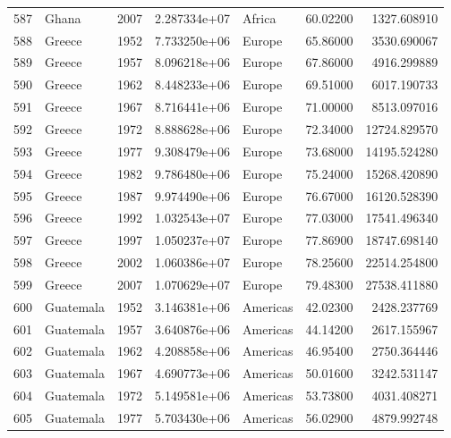 \documentclass[
  letterpaper,
  DIV=11,
  numbers=noendperiod]{scrreprt}
\begin{document}
\begin{tabular}{llrrlrr}
587  &                     Ghana &  2007 &  2.287334e+07 &    Africa &  60.02200 &    1327.608910 \\
588  &                    Greece &  1952 &  7.733250e+06 &    Europe &  65.86000 &    3530.690067 \\
589  &                    Greece &  1957 &  8.096218e+06 &    Europe &  67.86000 &    4916.299889 \\
590  &                    Greece &  1962 &  8.448233e+06 &    Europe &  69.51000 &    6017.190733 \\
591  &                    Greece &  1967 &  8.716441e+06 &    Europe &  71.00000 &    8513.097016 \\
592  &                    Greece &  1972 &  8.888628e+06 &    Europe &  72.34000 &   12724.829570 \\
593  &                    Greece &  1977 &  9.308479e+06 &    Europe &  73.68000 &   14195.524280 \\
594  &                    Greece &  1982 &  9.786480e+06 &    Europe &  75.24000 &   15268.420890 \\
595  &                    Greece &  1987 &  9.974490e+06 &    Europe &  76.67000 &   16120.528390 \\
596  &                    Greece &  1992 &  1.032543e+07 &    Europe &  77.03000 &   17541.496340 \\
597  &                    Greece &  1997 &  1.050237e+07 &    Europe &  77.86900 &   18747.698140 \\
598  &                    Greece &  2002 &  1.060386e+07 &    Europe &  78.25600 &   22514.254800 \\
599  &                    Greece &  2007 &  1.070629e+07 &    Europe &  79.48300 &   27538.411880 \\
600  &                 Guatemala &  1952 &  3.146381e+06 &  Americas &  42.02300 &    2428.237769 \\
601  &                 Guatemala &  1957 &  3.640876e+06 &  Americas &  44.14200 &    2617.155967 \\
602  &                 Guatemala &  1962 &  4.208858e+06 &  Americas &  46.95400 &    2750.364446 \\
603  &                 Guatemala &  1967 &  4.690773e+06 &  Americas &  50.01600 &    3242.531147 \\
604  &                 Guatemala &  1972 &  5.149581e+06 &  Americas &  53.73800 &    4031.408271 \\
605  &                 Guatemala &  1977 &  5.703430e+06 &  Americas &  56.02900 &    4879.992748 \\

\end{tabular}
\end{document}
